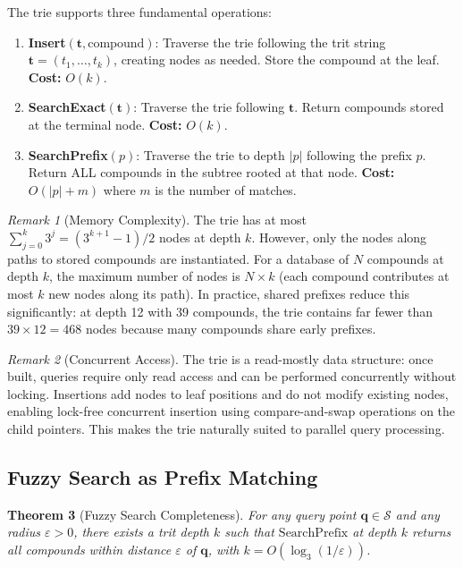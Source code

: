 \documentclass[11pt,a4paper]{article}
\newtheorem{theorem}{Theorem}[section]
\theoremstyle{definition}
\theoremstyle{remark}
\newtheorem{remark}[theorem]{Remark}
\newcommand{\Sspace}{\mathcal{S}}
\begin{document}
The trie supports three fundamental operations:

\begin{enumerate}
\item \textbf{Insert}$(\mathbf{t}, \text{compound})$: Traverse the trie following the trit string $\mathbf{t} = (t_1, \ldots, t_k)$, creating nodes as needed. Store the compound at the leaf. \textbf{Cost:} $O(k)$.

\item \textbf{SearchExact}$(\mathbf{t})$: Traverse the trie following $\mathbf{t}$. Return compounds stored at the terminal node. \textbf{Cost:} $O(k)$.

\item \textbf{SearchPrefix}$(p)$: Traverse the trie to depth $|p|$ following the prefix $p$. Return ALL compounds in the subtree rooted at that node. \textbf{Cost:} $O(|p| + m)$ where $m$ is the number of matches.
\end{enumerate}

\begin{remark}[Memory Complexity]
The trie has at most $\sum_{j=0}^{k} 3^j = (3^{k+1} - 1)/2$ nodes at depth $k$. However, only the nodes along paths to stored compounds are instantiated. For a database of $N$ compounds at depth $k$, the maximum number of nodes is $N \times k$ (each compound contributes at most $k$ new nodes along its path). In practice, shared prefixes reduce this significantly: at depth 12 with 39 compounds, the trie contains far fewer than $39 \times 12 = 468$ nodes because many compounds share early prefixes.
\end{remark}

\begin{remark}[Concurrent Access]
The trie is a read-mostly data structure: once built, queries require only read access and can be performed concurrently without locking. Insertions add nodes to leaf positions and do not modify existing nodes, enabling lock-free concurrent insertion using compare-and-swap operations on the child pointers. This makes the trie naturally suited to parallel query processing.
\end{remark}

\subsection{Fuzzy Search as Prefix Matching}
\label{sec:fuzzy_search}

\begin{theorem}[Fuzzy Search Completeness]
\label{thm:fuzzy}
For any query point $\mathbf{q} \in \Sspace$ and any radius $\varepsilon > 0$, there exists a trit depth $k$ such that $\mathrm{SearchPrefix}$ at depth $k$ returns all compounds within distance $\varepsilon$ of $\mathbf{q}$, with $k = O(\log_3(1/\varepsilon))$.
\end{theorem}
\end{document}
